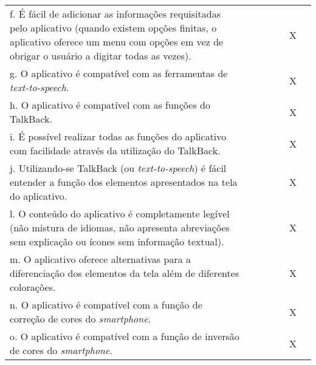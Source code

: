 \documentclass[portuguese,oneside]{tcc}
\begin{document}
\begin{table}[h]
{\begin{tabu}{|L{25em}|c|c|c|c|c|c|}
				f. É fácil de adicionar as informações requisitadas pelo aplicativo (quando existem opções finitas, o aplicativo oferece um menu com opções em vez de obrigar o usuário a digitar todas as vezes). & & & & & X & \\ 
				g. O aplicativo é compatível com as ferramentas de \emph{text-to-speech}. & & & & & X & \\ 
				h. O aplicativo é compatível com as funções do TalkBack. & & & & & X & \\ 
				i. É possível realizar todas as funções do aplicativo com facilidade através da utilização do TalkBack.	& & & & & X & \\ 
				j. Utilizando-se TalkBack (ou \emph{text-to-speech}) é fácil entender a função dos elementos apresentados na tela do aplicativo. & & & & & X & \\ 
				l. O conteúdo do aplicativo é completamente legível (não mistura de idiomas, não apresenta abreviações sem explicação ou ícones sem informação textual). & & & & & X & \\ 
				m. O aplicativo oferece alternativas para a diferenciação dos elementos da tela além de diferentes colorações. & & & & & X & \\ 
				n. O aplicativo é compatível com a função de correção de cores do \emph{smartphone}. & & & & & X & \\ 
				o. O aplicativo é compatível com a função de inversão de cores do \emph{smartphone}. & & & & & X & \\ 
		\end{tabu}}
\end{table}
\end{document}
